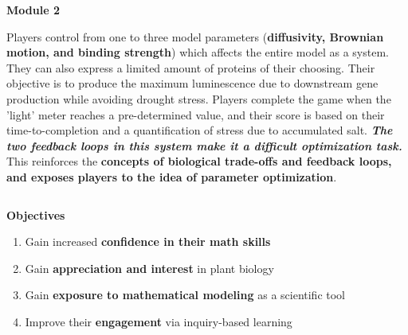 \documentclass[final]{beamer}
\newlength{\onecolwid}
\newlength{\twocolwid}
\begin{document}
\begin{frame}[t]
\begin{columns}[t]
\begin{column}{\twocolwid}
\begin{alertblock}{\color{Grey}\textbf{Module 2}}
\begin{figure}
\end{figure}
\small {Players control from one to three model parameters (\textbf{diffusivity, Brownian motion, and binding strength}) which affects the entire model as a system. They can also express a limited amount of proteins of their choosing. Their objective is to produce the maximum luminescence due to downstream gene production while avoiding drought stress. Players complete the game when the 'light' meter reaches a pre-determined value, and their score is based on their time-to-completion and a quantification of stress due to accumulated salt.\textit{ \textbf{The two feedback loops in this system make it a difficult optimization task.}} This reinforces the \textbf{concepts of biological trade-offs and feedback loops, and exposes players to the idea of parameter optimization}.}
\end{alertblock} 


\begin{columns}[t,totalwidth=\twocolwid] %

\begin{column}{\onecolwid} %
\vspace{-1cm}
\begin{block}{\textbf{\Large Objectives}}
{\large 
\begin{enumerate}
	\itemsep0em 
	\item Gain increased \textbf{confidence in their math skills}
	\item Gain \textbf{appreciation and interest }in plant biology \cite{plantinterest1}
	\item Gain\textbf{ exposure to mathematical modeling} as a scientific tool 
	\item Improve their \textbf{engagement }via inquiry-based learning \cite{math2}
\end{enumerate}
}
\end{block}


\end{column} %


\end{columns}
\end{column}
\end{columns}
\end{frame}
\end{document}
